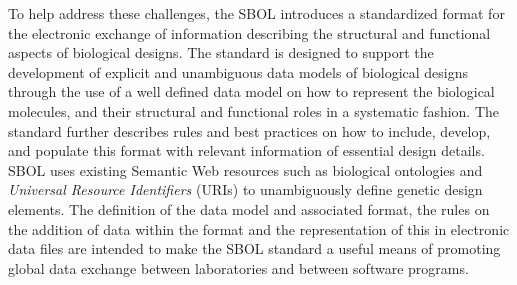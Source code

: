 To help address these challenges, the SBOL introduces a standardized format for the electronic exchange of information describing the structural and functional aspects of biological designs. 
The standard is designed to support the development of explicit and unambiguous data models of biological designs through the use of a well defined data model on how to represent the biological molecules, and their structural and functional roles in a systematic fashion. 
The standard further describes rules and best practices on how to include, develop, and populate this format with relevant information of essential design details. 
SBOL uses existing Semantic Web resources such as biological ontologies and \emph{Universal Resource Identifiers} (URIs) to unambiguously define genetic design elements.
The definition of the data model and associated format, the rules on the addition of data within the format and the representation of this in electronic data files are intended to make the SBOL standard a useful means of promoting global data exchange between laboratories and between software programs.

